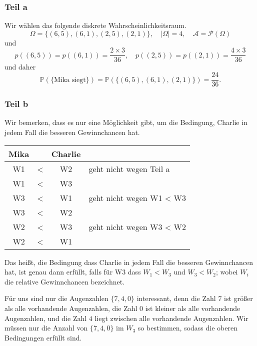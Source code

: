 \documentclass[fleqn,draft,a5paper]{article}
\providecommand{\abs}[1]{\left\lvert#1\right\rvert}
\theoremstyle{remark}
\begin{document}
\subsubsection{Teil a}
Wir wählen das folgende diskrete Wahrscheinlichkeitsraum.
\[ \Omega = \{(6,5), (6,1), (2,5), (2,1)\}, \quad \abs{\Omega} = 4, \quad \mathcal{A} = \mathcal{P}(\Omega) \]
und
\[p((6,5)) = p((6,1)) =\frac{2\times3}{36}, \quad p((2,5)) = p((2,1)) = 
  \frac{4\times3}{36} \]
und daher
\[\mathbb{P}(\{\text{Mika siegt}\}) = \mathbb{P}(\{(6,5),(6,1),(2,1)\})=
  \frac{24}{36}.\]
\subsubsection{Teil b}
Wir bemerken, dass es nur eine Möglichkeit gibt, um die Bedingung,
Charlie in jedem Fall die besseren Gewinnchancen hat.
\begin{center}
\begin{tabular}{c c c| l}
  Mika & & Charlie & \\
  \hline
  W1 & < & W2 & geht nicht wegen Teil a \\
  W1 & < & W3 & \\
  W3 & < & W1 & geht nicht wegen W1 < W3 \\
  W3 & < & W2 & \\
  W2 & < & W3 & geht nicht wegen W3 < W2 \\
  W2 & < & W1
\end{tabular}  
\end{center}
Das heißt, die Bedingung dass Charlie in jedem Fall die besseren
Gewinnchancen hat, ist genau dann erfüllt, falls für W3 dass \(W_{1} <
W_{3}\) und \(W_{3} < W_{2}\); wobei \(W_{i}\) die relative Gewinnchancen
bezeichnet.

Für uns sind nur die Augenzahlen \(\{7,4,0\}\) interessant, denn die
Zahl \(7\) ist größer als alle vorhandende Augenzahlen, die Zahl \(0\) ist
kleiner als alle vorhandende Augenzahlen, und die Zahl \(4\) liegt
zwischen alle vorhandende Augenzahlen.  Wir müssen nur die Anzahl von
\(\{7,4,0\}\) im \(W_{3}\) so bestimmen, sodass die oberen Bedingungen
erfüllt sind.
\end{document}

